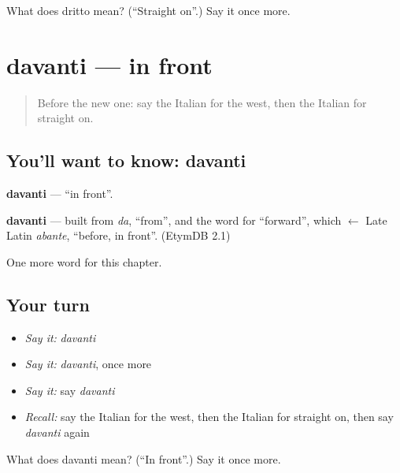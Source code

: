 \begin{tcolorbox}[breakable,colback=teal!4,colframe=teal!35!black,title={Before you move on}]
What does dritto mean? (\textquotedblleft{}Straight on\textquotedblright{}.) Say it once more.
\end{tcolorbox}
\section[davanti]{davanti — in front}

\label{lesson:IT-C91-davanti}



\begin{quote}
Before the new one: say the Italian for the west, then the Italian for straight on.
\end{quote}

\subsection*{You'll want to know: davanti}
\textbf{davanti} — \textquotedblleft{}in front\textquotedblright{}.

\begin{cousinweb}
\textbf{davanti} — built from \emph{da}, \textquotedblleft{}from\textquotedblright{}, and the word for \textquotedblleft{}forward\textquotedblright{}, which $\leftarrow$ Late Latin \emph{abante}, \textquotedblleft{}before, in front\textquotedblright{}. (EtymDB 2.1)
\end{cousinweb}

\begin{grammarlens}[title={What you've built}]
One more word for this chapter.
\end{grammarlens}

\subsection*{Your turn}
\begin{itemize}
\raggedright
  \item \emph{Say it:} \emph{davanti}
  \item \emph{Say it:} \emph{davanti}, once more
  \item \emph{Say it:} say \emph{davanti}
  \item \emph{Recall:} say the Italian for the west, then the Italian for straight on, then say \emph{davanti} again
\end{itemize}

\begin{tcolorbox}[breakable,colback=teal!4,colframe=teal!35!black,title={Before you move on}]
What does davanti mean? (\textquotedblleft{}In front\textquotedblright{}.) Say it once more.
\end{tcolorbox}
